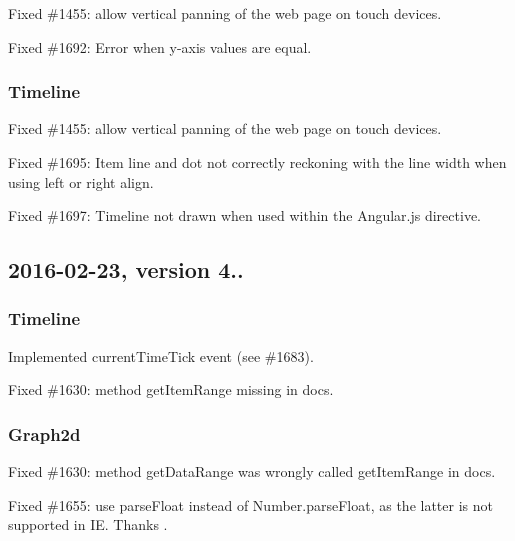 \begin{DoxyItemize}
\item Fixed \#1455\+: allow vertical panning of the web page on touch devices.
\item Fixed \#1692\+: Error when y-\/axis values are equal.
\end{DoxyItemize}

\subsubsection*{Timeline}


\begin{DoxyItemize}
\item Fixed \#1455\+: allow vertical panning of the web page on touch devices.
\item Fixed \#1695\+: Item line and dot not correctly reckoning with the line width when using left or right align.
\item Fixed \#1697\+: Timeline not drawn when used within the Angular.\+js directive.
\end{DoxyItemize}

\subsection*{2016-\/02-\/23, version 4..}

\subsubsection*{Timeline}


\begin{DoxyItemize}
\item Implemented {\ttfamily current\+Time\+Tick} event (see \#1683).
\item Fixed \#1630\+: method {\ttfamily get\+Item\+Range} missing in docs.
\end{DoxyItemize}

\subsubsection*{Graph2d}


\begin{DoxyItemize}
\item Fixed \#1630\+: method {\ttfamily get\+Data\+Range} was wrongly called {\ttfamily get\+Item\+Range} in docs.
\item Fixed \#1655\+: use parse\+Float instead of Number.\+parse\+Float, as the latter is not supported in IE. Thanks .
\end{DoxyItemize}

